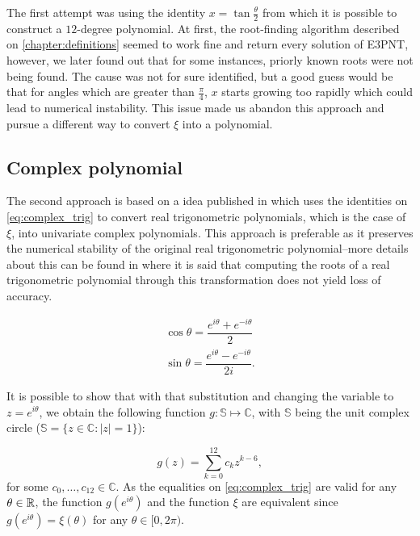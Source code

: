 The first attempt was using the identity $x = \tan{\frac{\theta}{2}}$ from which it is possible to construct a $12$-degree polynomial. At first,  the root-finding algorithm described on \autoref{chapter:definitions} seemed to work fine and return every solution of E3PNT, however, we later found out that for some instances, priorly known roots were not being found. The cause was not for sure identified, but a good guess would be that for angles which are greater than $\frac{\pi}{4}$, $x$ starts growing too rapidly which could lead to numerical instability. This issue made us abandon this approach and pursue a different way to convert $\xi$ into a polynomial.

\subsection{Complex polynomial}

The second approach is based on a idea published in  which uses the identities on \autoref{eq:complex_trig} to convert real trigonometric polynomials, which is the case of $\xi$, into univariate complex polynomials. This approach is preferable as it preserves the numerical stability of the original real trigonometric polynomial--more details about this can be found in  where it is said that computing the roots of a real trigonometric polynomial through this transformation does not yield loss of accuracy.

\begin{align}\label{eq:complex_trig}
\cos{\theta} = \dfrac{e^{i\theta} + e^{-i\theta}}{2}\\
\sin{\theta} = \dfrac{e^{i\theta} - e^{-i\theta}}{2i}.
\end{align}

It is possible to show that with that substitution and changing the variable to $z=e^{i\theta}$, we obtain the following function $g : \mathbb{S} \mapsto \mathbb{C}$, with $\mathbb{S}$ being the unit complex circle ($\mathbb{S} = \{z \in \mathbb{C} : |z|=1\}$):

\begin{equation}
g(z)=\sum_{k=0}^{12} c_k z^{k-6},
\end{equation}
for some $c_0, \dots, c_{12} \in \mathbb{C}$. As the equalities on \autoref{eq:complex_trig} are valid for any $\theta \in \mathbb{R}$, the function $g(e^{i\theta})$ and the function $\xi$ are equivalent since $g(e^{i\theta}) = \xi(\theta)$ for any $\theta \in [0, 2\pi)$. 

